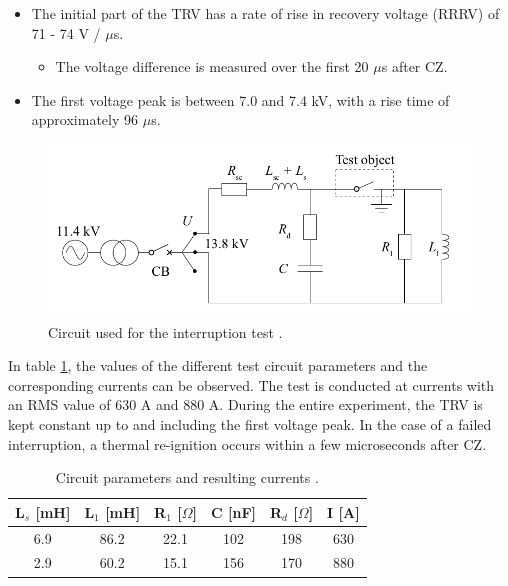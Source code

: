 \documentclass[10pt,b5paper,twoside]{article}
\begin{document}
\begin{itemize}
\item The initial part of the TRV has a rate of rise in recovery voltage (RRRV) of 71 - 74 V / $\mu$s.
	\begin{itemize}
		\item The voltage difference is measured over the first 20 $\mu$s after CZ.
	\end{itemize}
\item The first voltage peak is between 7.0 and 7.4 kV, with a rise time of approximately 96 $\mu$s.
\end{itemize}

\begin{figure} [H]
\centering
\includegraphics[scale=0.35]{Bilder/Method/circuit.png}
\caption{Circuit used for the interruption test \cite{bib:AFIMVLBA}.} \label{fig:testCurcuit}
\end{figure}

In table \ref{tab:testParameters}, the values of the different test circuit parameters and the corresponding currents can be observed. The test is conducted at currents with an RMS value of 630 A and 880 A. During the entire experiment, the TRV is kept constant up to and including the first voltage peak. In the case of a failed interruption, a thermal re-ignition occurs within a few microseconds after CZ.

\begin{table}[H]
\center
\caption{Circuit parameters and resulting currents \cite{bib:AFIMVLBA}. }
\begin{tabular}{|c|c|c|c|c|c|}
\hline 
L$_s$ [mH] & L$_1$ [mH] & R$_1$ [$\Omega$] & C [nF] & R$_{d}$ [$\Omega$] & I [A] \\ 
\hline 
6.9 & 86.2 & 22.1 & 102 & 198 & 630 \\ 
\hline
2.9 & 60.2 & 15.1 & 156 & 170 & 880 \\
\hline   
\end{tabular} 
\label{tab:testParameters}
\end{table}
\end{document}
